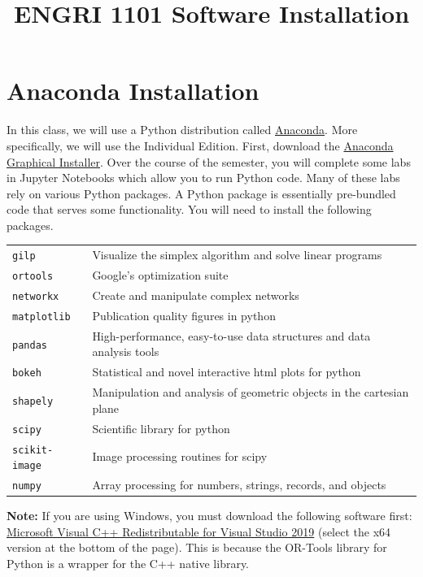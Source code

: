 \documentclass[11 pt]{article}
\title{ENGRI 1101 Software Installation}
\date{}
\begin{document}
\maketitle

\section{Anaconda Installation}

In this class, we will use a Python distribution called \href{https://www.anaconda.com/}{Anaconda}. More specifically, we will use the Individual Edition. First, download the \href{https://www.anaconda.com/products/individual}{Anaconda Graphical Installer}. Over the course of the semester, you will complete some labs in Jupyter Notebooks which allow you to run Python code. Many of these labs rely on various Python packages. A Python package is essentially pre-bundled code that serves some functionality. You will need to install the following packages. 

\begin{center}
\begin{tabular}{ll}
 \texttt{gilp} & Visualize the simplex algorithm and solve linear programs \\
 \texttt{ortools} & Google's optimization suite \\
 \texttt{networkx} &  Create and manipulate complex networks \\
 \texttt{matplotlib} & Publication quality figures in python \\
 \texttt{pandas} & High-performance, easy-to-use data structures and data analysis tools \\
 \texttt{bokeh} & Statistical and novel interactive html plots for python \\
 \texttt{shapely} & Manipulation and analysis of geometric objects in the cartesian plane \\
 \texttt{scipy} & Scientific library for python \\
 \texttt{scikit-image} & Image processing routines for scipy \\
 \texttt{numpy} & Array processing for numbers, strings, records, and objects \\
\end{tabular}
\end{center}

\noindent \textbf{Note:} If you are using Windows, you must download the following software first: \href{https://visualstudio.microsoft.com/downloads/?q=Visual+C\%2B\%2B+Redistributable+for+Visual+Studio}{Microsoft Visual C++ Redistributable for Visual Studio 2019} (select the x64 version at the bottom of the page). This is because the OR-Tools library for Python is a wrapper for the C++ native library. \newline
\end{document}
